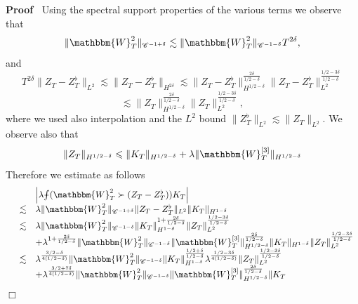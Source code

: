 \documentclass[11pt, oneside]{article}   	%
\newenvironment{proof}{\noindent\textbf{Proof\ }}{\hspace*{\fill}$\Box$\medskip}
\def\Xint#1{\mathchoice
{\XXint\displaystyle\textstyle{#1}}%
{\XXint\textstyle\scriptstyle{#1}}%
{\XXint\scriptstyle\scriptscriptstyle{#1}}%
{\XXint\scriptscriptstyle\scriptscriptstyle{#1}}%
\!\int}
\def\XXint#1#2#3{{\setbox0=\hbox{$#1{#2#3}{\int}$ }
\vcenter{\hbox{$#2#3$ }}\kern-.6\wd0}}
\def\dashint{\Xint-}
\newcommand{\bint}{\dashint}
\newcommand{\VV}{\mathscr{C}}
\begin{document}
\begin{proof}
  Using the spectral support properties of the various terms we observe that
  \[ \| \mathbbm{W}^2_T \|_{\VV^{- 1 + \delta}} \lesssim \| \mathbbm{W}^2_T
     \|_{\VV^{- 1 - \delta}} T^{2 \delta}, \]
  and
  \[ T^{2 \delta} \| Z_T - Z^{\flat}_T \|_{L^2} \lesssim \| Z_T - Z^{\flat}_T
     \|_{H^{2 \delta}} \lesssim \| Z_T - Z^{\flat}_T \|^{\frac{2 \delta}{1 / 2
     - \delta}}_{H^{1 / 2 - \delta}} \| Z_T - Z^{\flat}_T \|^{\frac{1 / 2 - 3
     \delta}{1 / 2 - \delta}}_{L^2} \]
  \[ \lesssim \| Z_T \|^{\frac{2 \delta}{1 / 2 - \delta}}_{H^{1 / 2 - \delta}}
     \| Z_T \|^{\frac{1 / 2 - 3 \delta}{1 / 2 - \delta}}_{L^2}, \]
  where we used also interpolation and the $L^2$ bound $\| Z^{\flat}_T
  \|_{L^2} \lesssim \| Z_T \|_{L^2}$. We observe also that
  \begin{equation}
    \| Z_T \|_{H^{1 / 2 - \delta}} \leqslant \| K_T \|_{H^{1 / 2 - \delta}}
    + \lambda \| \mathbbm{W}_T^{[3]} \|_{H^{1 / 2 - \delta}}
    \label{eq:bound-Z-K}
  \end{equation}
  Therefore we estimate as follows
  \[ \begin{array}{lll}
       &  & \left| \lambda \bint (\mathbbm{W}^2_T \succ (Z_T - Z^{\flat}_T) )
       K_T \right|\\
       & \lesssim & \lambda \| \mathbbm{W}^2_T \|_{\VV^{- 1 + \delta}} \| Z_T
       - Z^{\flat}_T \|_{L^2} \| K_T \|_{H^{1 - \delta}}\\
       & \lesssim & \lambda \| \mathbbm{W}^2_T \|_{\VV^{- 1 - \delta}} \| K_T
       \|^{1 + \frac{2 \delta}{1 / 2 - \delta}}_{H^{1 - \delta}} \| Z_T
       \|^{\frac{1 / 2 - 3 \delta}{1 / 2 - \delta}}_{L^2}\\
       &  & + \lambda^{1 + \frac{2 \delta}{1 / 2 - \delta}} \|
       \mathbbm{W}^2_T \|_{\VV^{- 1 - \delta}} \| \mathbbm{W}_T^{[3]}
       \|^{\frac{2 \delta}{1 / 2 - \delta}}_{H^{1 / 2 - \delta}} \| K_T
       \|_{H^{1 - \delta}} \| Z_T \|^{\frac{1 / 2 - 3 \delta}{1 / 2 -
       \delta}}_{L^2}\\
       & \lesssim & \lambda^{\frac{3 / 2 - \delta}{4 (1 / 2 - \delta)}} \|
       \mathbbm{W}^2_T \|_{\VV^{- 1 - \delta}} \| K_T \|^{\frac{1 / 2 +
       \delta}{1 / 2 - \delta}}_{H^{1 - \delta}} \lambda^{\frac{1 / 2 - 3
       \delta}{4 (1 / 2 - \delta)}} \| Z_T \|^{\frac{1 / 2 - 3 \delta}{1 / 2 -
       \delta}}_{L^2}\\
       &  & + \lambda^{\frac{3 / 2 + 7 \delta}{4 (1 / 2 - \delta)}} \|
       \mathbbm{W}^2_T \|_{\VV^{- 1 - \delta}} \| \mathbbm{W}_T^{[3]}
       \|^{\frac{2 \delta}{1 / 2 - \delta}}_{H^{1 / 2 - \delta}} \| K_T

\end{array}\]
\end{proof}
\end{document}
